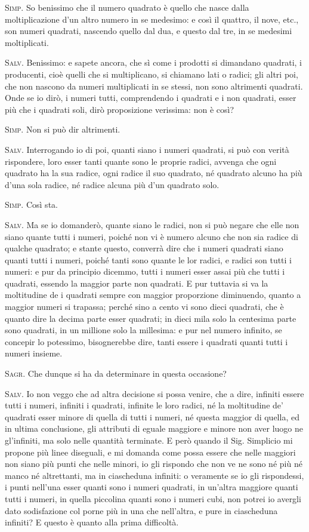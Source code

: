 \documentclass[11pt,twoside,openany]{book}
\newcommand{\speaker}[1]{\textcolor{rubric}{\textsc{#1}}\space}
\begin{document}
\speaker{Simp.} So benissimo che il numero quadrato è quello che nasce dalla moltiplicazione d'un altro numero in se medesimo: e così il quattro, il nove, etc., son numeri quadrati, nascendo quello dal dua, e questo dal tre, in se medesimi moltiplicati.

\speaker{Salv.} Benissimo: e sapete ancora, che sì come i prodotti si dimandano quadrati, i producenti, cioè quelli che si multiplicano, si chiamano lati o radici; gli altri poi, che non nascono da numeri multiplicati in se stessi, non sono altrimenti quadrati. Onde se io dirò, i numeri tutti, comprendendo i quadrati e i non quadrati, esser più che i quadrati soli, dirò proposizione verissima: non è così?

\speaker{Simp.} Non si può dir altrimenti.

\speaker{Salv.} Interrogando io di poi, quanti siano i numeri quadrati, si può con verità rispondere, loro esser tanti quante sono le proprie radici, avvenga che ogni quadrato ha la sua radice, ogni radice il suo quadrato, né quadrato alcuno ha più d'una sola radice, né radice alcuna più d'un quadrato solo.

\speaker{Simp.} Così sta.

\speaker{Salv.} Ma se io domanderò, quante siano le radici, non si può negare che elle non siano quante tutti i numeri, poiché non vi è numero alcuno che non sia radice di qualche quadrato; e stante questo, converrà dire che i numeri quadrati siano quanti tutti i numeri, poiché tanti sono quante le lor radici, e radici son tutti i numeri: e pur da principio dicemmo, tutti i numeri esser assai più che tutti i quadrati, essendo la maggior parte non quadrati. E pur tuttavia si va la moltitudine de i quadrati sempre con maggior proporzione diminuendo, quanto a maggior numeri si trapassa; perché sino a cento vi sono dieci quadrati, che è quanto dire la decima parte esser quadrati; in dieci mila solo la centesima parte sono quadrati, in un millione solo la millesima: e pur nel numero infinito, se concepir lo potessimo, bisognerebbe dire, tanti essere i quadrati quanti tutti i numeri insieme.

\speaker{Sagr.} Che dunque si ha da determinare in questa occasione?

\speaker{Salv.} Io non veggo che ad altra decisione si possa venire, che a dire, infiniti essere tutti i numeri, infiniti i quadrati, infinite le loro radici, né la moltitudine de' quadrati esser minore di quella di tutti i numeri, né questa maggior di quella, ed in ultima conclusione, gli attributi di eguale maggiore e minore non aver luogo ne gl'infiniti, ma solo nelle quantità terminate. E però quando il Sig. Simplicio mi propone più linee diseguali, e mi domanda come possa essere che nelle maggiori non siano più punti che nelle minori, io gli rispondo che non ve ne sono né più né manco né altrettanti, ma in ciascheduna infiniti: o veramente se io gli rispondessi, i punti nell'una esser quanti sono i numeri quadrati, in un'altra maggiore quanti tutti i numeri, in quella piccolina quanti sono i numeri cubi, non potrei io avergli dato sodisfazione col porne più in una che nell'altra, e pure in ciascheduna infiniti? E questo è quanto alla prima difficoltà.
\end{document}
